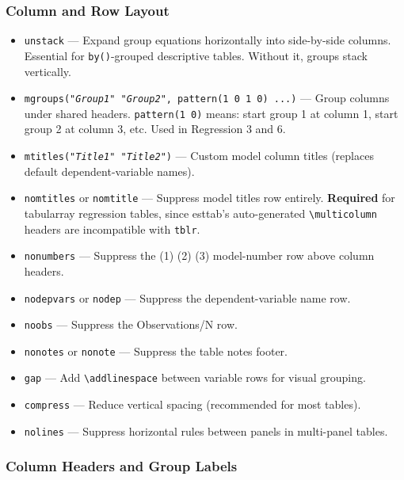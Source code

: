 \documentclass[11pt]{article}
\numberwithin{table}{section}
\begin{document}
\subsubsection{Column and Row Layout}

\begin{itemize}
    \item \texttt{unstack} --- Expand group equations horizontally into side-by-side columns. Essential for \texttt{by()}-grouped descriptive tables. Without it, groups stack vertically.
    \item \texttt{mgroups("\emph{Group1}" "\emph{Group2}", pattern(1 0 1 0) ...)} --- Group columns under shared headers. \texttt{pattern(1 0)} means: start group 1 at column 1, start group 2 at column 3, etc. Used in Regression 3 and 6.
    \item \texttt{mtitles("\emph{Title1}" "\emph{Title2}")} --- Custom model column titles (replaces default dependent-variable names).
    \item \texttt{nomtitles} or \texttt{nomtitle} --- Suppress model titles row entirely. \textbf{Required} for tabularray regression tables, since esttab's auto-generated \texttt{\textbackslash multicolumn} headers are incompatible with \texttt{tblr}.
    \item \texttt{nonumbers} --- Suppress the (1) (2) (3) model-number row above column headers.
    \item \texttt{nodepvars} or \texttt{nodep} --- Suppress the dependent-variable name row.
    \item \texttt{noobs} --- Suppress the Observations/N row.
    \item \texttt{nonotes} or \texttt{nonote} --- Suppress the table notes footer.
    \item \texttt{gap} --- Add \texttt{\textbackslash addlinespace} between variable rows for visual grouping.
    \item \texttt{compress} --- Reduce vertical spacing (recommended for most tables).
    \item \texttt{nolines} --- Suppress horizontal rules between panels in multi-panel tables.
\end{itemize}

\subsubsection{Column Headers and Group Labels}
\end{document}
